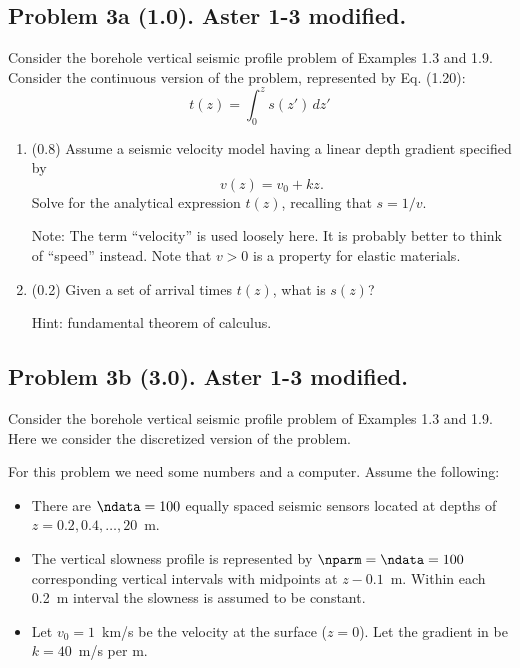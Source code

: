 \documentclass[11pt,titlepage,fleqn]{article}
\begin{document}

\pagebreak
\subsection*{Problem 3a (1.0). Aster 1-3 modified.}

Consider the borehole vertical seismic profile problem of Examples 1.3 and 1.9. Consider the continuous version of the problem, represented by Eq. (1.20):
%
\begin{equation}
t(z) = \int_0^z s(z')\,dz'
\label{tz}
\end{equation}

\begin{enumerate}

\item (0.8) Assume a seismic velocity model having a linear depth gradient specified by
%
\begin{equation}
v(z) = v_0 + kz.
\label{vz}
\end{equation}
%
Solve for the analytical expression $t(z)$, recalling that $s = 1/v$.

Note: The term ``velocity'' is used loosely here. It is probably better to think of ``speed'' instead. Note that $v > 0$ is a property for elastic materials.


\item (0.2) Given a set of arrival times $t(z)$, what is $s(z)$?

Hint: fundamental theorem of calculus.

\end{enumerate}


\subsection*{Problem 3b (3.0). Aster 1-3 modified.}

Consider the borehole vertical seismic profile problem of Examples 1.3 and 1.9. Here we consider the discretized version of the problem. 

For this problem we need some numbers and a computer. Assume the following:
%
\begin{itemize}
\item There are $\ndata=100$ equally spaced seismic sensors located at depths of $z = 0.2, 0.4, \ldots, 20$~m.
\item The vertical slowness profile is represented by $\nparm=\ndata=100$ corresponding vertical intervals with midpoints at $z - 0.1$~m. Within each 0.2~m interval the slowness is assumed to be constant.
\item Let $v_0 = 1$~km/s be the velocity at the surface ($z=0$). Let the gradient in  be $k = 40$~m/s per m.
\end{itemize}
\end{document}
